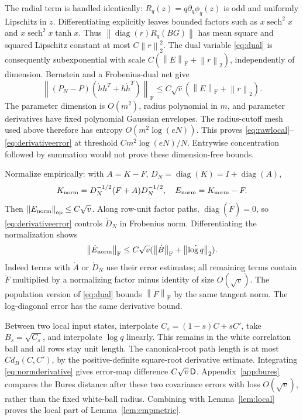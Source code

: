 \documentclass[11pt]{article}
\newcommand{\diag}{\operatorname{diag}}\newcommand{\sech}{\operatorname{sech}}
\newcommand{\op}{\mathrm{op}}\newcommand{\F}{\mathrm F}
\newcommand{\norm}[1]{\left\lVert#1\right\rVert}
\begin{document}
The radial term is handled identically: $R_q(z)=q\partial_q\phi_q(z)$ is odd and uniformly Lipschitz in $z$. Differentiating explicitly leaves bounded factors such as $x\sech^2x$ and $x\sech^2x\tanh x$. Thus $\norm{\diag(r)R_q(BG)}$ has mean square and squared Lipschitz constant at most $C\norm r_2^2$. The dual variable \eqref{eq:dual} is consequently subexponential with scale $C(\norm E_\F+\norm r_2)$, independently of dimension. Bernstein and a Frobenius-dual net give
\begin{equation}\label{eq:derivativeerror}
 \norm{(P_N-P)(\dot h h^T+h\dot h^T)}_\F
 \le C\sqrt v(\norm E_\F+\norm r_2).
\end{equation}
The parameter dimension is $O(m^2)$, radius polynomial in $m$, and parameter derivatives have fixed polynomial Gaussian envelopes. The radius-cutoff mesh used above therefore has entropy $O(m^2\log(eN))$. This proves \eqref{eq:rawlocal}--\eqref{eq:derivativeerror} at threshold $Cm^2\log(eN)/N$. Entrywise concentration followed by summation would not prove these dimension-free bounds.

Normalize empirically: with $A=K-F$, $D_N=\diag(K)=I+\diag(A)$,
\[
 K_{\rm norm}=D_N^{-1/2}(F+A)D_N^{-1/2},\quad E_{\rm norm}=K_{\rm norm}-F.
\]
Then $\norm{E_{\rm norm}}_\op\le C\sqrt v$. Along row-unit factor paths, $\diag(\dot F)=0$, so \eqref{eq:derivativeerror} controls $\dot D_N$ in Frobenius norm. Differentiating the normalization shows
\begin{equation}\label{eq:normderivative}
 \norm{\dot E_{\rm norm}}_\F
 \le C\sqrt v(\norm{\dot B}_\F+\norm{\dot{\log q}}_2).
\end{equation}
Indeed terms with $\dot A$ or $\dot D_N$ use their error estimates; all remaining terms contain $\dot F$ multiplied by a normalizing factor minus identity of size $O(\sqrt v)$. The population version of \eqref{eq:dual} bounds $\norm{\dot F}_\F$ by the same tangent norm. The log-diagonal error has the same derivative bound.

Between two local input states, interpolate $C_s=(1-s)C+sC'$, take $B_s=\sqrt{C_s}$, and interpolate $\log q$ linearly. This remains in the white correlation ball and all rows stay unit length. The canonical-root path length is at most $C d_B(C,C')$, by the positive-definite square-root derivative estimate. Integrating \eqref{eq:normderivative} gives error-map difference $C\sqrt v\,\mathsf D$. Appendix~\ref{app:bures} compares the Bures distance after these two covariance errors with loss $O(\sqrt v)$, rather than the fixed white-ball radius. Combining with Lemma~\ref{lem:local} proves the local part of Lemma~\ref{lem:empmetric}.
\end{document}
